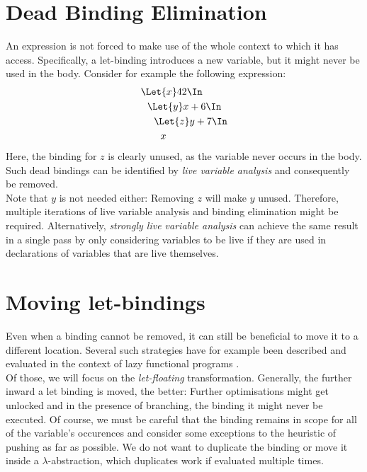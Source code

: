 \section{Dead Binding Elimination}
\label{sec:program-transformations-dbe}
An expression is not forced to make use of the whole context to which it has access.
Specifically, a let-binding introduces a new variable, but it might never be used
in the body.
Consider for example the following expression:
\begin{align*}
  &\Let{x} 42 \In            \\
  &\ \ \Let{y} x + 6 \In     \\
  &\ \ \ \ \Let{z} y + 7 \In \\
  &\ \ \ \ \ \ x
\end{align*}
Here, the binding for $z$ is clearly unused, as the variable never occurs in the body.
Such dead bindings can be identified by \emph{live variable analysis}
and consequently be removed.
\\
Note that $y$ is not needed either: Removing $z$ will make $y$ unused.
Therefore, multiple iterations of live variable analysis and binding elimination might be required.
Alternatively, \emph{strongly live variable analysis} can achieve the same result in a single pass
by only considering variables to be live
if they are used in declarations of variables that are live themselves.


\section{Moving let-bindings}
\label{sec:program-transformations-let-floating}
Even when a binding cannot be removed,
it can still be beneficial to move it to a different location.
Several such strategies have for example been described and evaluated
in the context of lazy functional programs
\cite{Jones1996LetFloating}.
\\
Of those, we will focus on the \emph{let-floating} transformation.
Generally, the further inward a let binding is moved, the better:
Further optimisations might get unlocked and in the presence of branching,
the binding it might never be executed.
Of course, we must be careful that the binding remains in scope
for all of the variable's occurences
and consider some exceptions to the heuristic of pushing as far as possible.
We do not want to duplicate the binding
or move it inside a $\lambda$-abstraction, which duplicates work
if evaluated multiple times.

\vspace{1cm}
